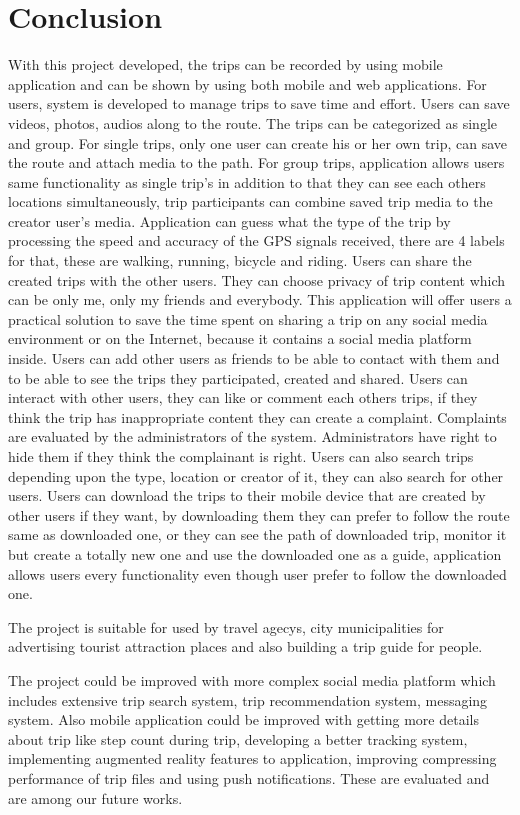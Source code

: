 \chapter{Conclusion}

	With this project developed, the trips can be recorded by using mobile application and can be shown by using both mobile and web applications. For users, system is developed to manage trips to save time and effort. Users can save videos, photos, audios along to the route. The trips can be categorized as single and group. For single trips, only one user can create his or her own trip, can save the route and attach media to the path. For group trips, application allows users same functionality as single trip's in addition to that they can see each others locations simultaneously, trip participants can combine saved trip media to the creator user's media. Application can guess what the type of the trip by processing the speed and accuracy of the GPS signals received, there are 4 labels for that, these are walking, running, bicycle and riding. Users can share the created trips with the other users. They can choose privacy of trip content which can be only me, only my friends and everybody. This application will offer users a practical solution to save the time spent on sharing a trip on any social media environment or on the Internet, because it contains a social media platform inside. Users can add other users as friends to be able to contact with them and to be able to see the trips they participated, created and shared. Users can interact with other users, they can like or comment each others trips, if they think the trip has inappropriate content they can create a complaint. Complaints are evaluated by the administrators of the system. Administrators have right to hide them if they think the complainant is right. Users can also search trips depending upon the type, location or creator of it, they can also search for other users. Users can download the trips to their mobile device that are created by other users if they want, by downloading them they can prefer to follow the route same as downloaded one, or they can see the path of downloaded trip, monitor it but create a totally new one and use the downloaded one as a guide, application allows users every functionality even though user prefer to follow the downloaded one.

	The project is suitable for used by travel agecys, city municipalities for advertising tourist attraction places and also building a trip guide for people.

	The project could be improved with more complex social media platform which includes extensive trip search system, trip recommendation system, messaging system. Also mobile application could be improved with getting more details about trip like step count during trip, developing a better tracking system, implementing augmented reality features to application, improving compressing performance of trip files and using push notifications. These are evaluated and are among our future works.

